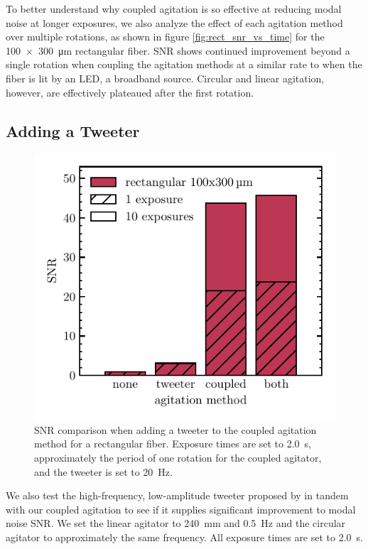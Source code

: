 \documentclass[twocolumn]{emulateapj}
\begin{document}
To better understand why coupled agitation is so effective at reducing modal noise at longer exposures, we also analyze the effect of each agitation method over multiple rotations, as shown in figure \ref{fig:rect_snr_vs_time} for the \SI{100x300}{\micro\meter} rectangular fiber. SNR shows continued improvement beyond a single rotation when coupling the agitation methods at a similar rate to when the fiber is lit by an LED, a broadband source. Circular and linear agitation, however, are effectively plateaued after the first rotation.

\subsection{Adding a Tweeter}

\begin{figure}
\centering
	\includegraphics[width=\columnwidth]{images/tweeter_snr.pdf}
	\caption{SNR comparison when adding a tweeter to the coupled agitation method for a rectangular fiber. Exposure times are set to \SI{2.0}{\second}, approximately the period of one rotation for the coupled agitator, and the tweeter is set to \SI{20}{\hertz}.}
\label{fig:tweeter_snr}
\end{figure}

We also test the high-frequency, low-amplitude tweeter proposed by \citep{Plavchan2013} in tandem with our coupled agitation to see if it supplies significant improvement to modal noise SNR. We set the linear agitator to \SI{240}{\milli\meter} and \SI{0.5}{\hertz} and the circular agitator to approximately the same frequency. All exposure times are set to \SI{2.0}{\second}.
\end{document}
